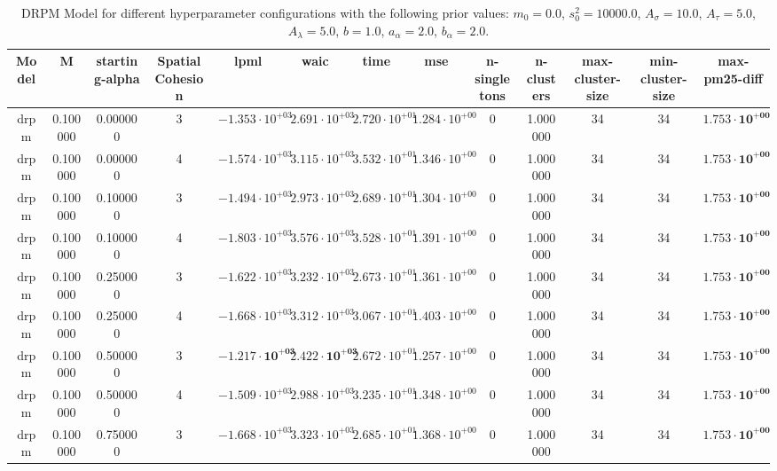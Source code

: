 \begin{table}
\caption{DRPM Model for different hyperparameter configurations with the following prior values:  $m_0 = 0.0$, $s_0^2 = 10000.0$, $A_\sigma = 10.0$, $A_\tau = 5.0$, $A_\lambda = 5.0$, $b = 1.0$, $a_\alpha = 2.0$, $b_\alpha = 2.0$.}
\centering
\begin{tabular}{ccccccccccccc}
\toprule
Model & M & starting-alpha & SpatialCohesion & lpml & waic & time & mse & n-singletons & n-clusters & max-cluster-size & min-cluster-size & max-pm25-diff \\
\midrule
drpm & 0.100000 & 0.000000 & 3 & $-1.353 \cdot 10^{+03}$ & $2.691 \cdot 10^{+03}$ & $2.720 \cdot 10^{+01}$ & $1.284 \cdot 10^{+00}$ & 0 & 1.000000 & 34 & 34 & $\mathbf{1.753 \cdot 10^{+00}}$ \\
drpm & 0.100000 & 0.000000 & 4 & $-1.574 \cdot 10^{+03}$ & $3.115 \cdot 10^{+03}$ & $3.532 \cdot 10^{+01}$ & $1.346 \cdot 10^{+00}$ & 0 & 1.000000 & 34 & 34 & $\mathbf{1.753 \cdot 10^{+00}}$ \\
drpm & 0.100000 & 0.100000 & 3 & $-1.494 \cdot 10^{+03}$ & $2.973 \cdot 10^{+03}$ & $2.689 \cdot 10^{+01}$ & $1.304 \cdot 10^{+00}$ & 0 & 1.000000 & 34 & 34 & $\mathbf{1.753 \cdot 10^{+00}}$ \\
drpm & 0.100000 & 0.100000 & 4 & $-1.803 \cdot 10^{+03}$ & $3.576 \cdot 10^{+03}$ & $3.528 \cdot 10^{+01}$ & $1.391 \cdot 10^{+00}$ & 0 & 1.000000 & 34 & 34 & $\mathbf{1.753 \cdot 10^{+00}}$ \\
drpm & 0.100000 & 0.250000 & 3 & $-1.622 \cdot 10^{+03}$ & $3.232 \cdot 10^{+03}$ & $2.673 \cdot 10^{+01}$ & $1.361 \cdot 10^{+00}$ & 0 & 1.000000 & 34 & 34 & $\mathbf{1.753 \cdot 10^{+00}}$ \\
drpm & 0.100000 & 0.250000 & 4 & $-1.668 \cdot 10^{+03}$ & $3.312 \cdot 10^{+03}$ & $3.067 \cdot 10^{+01}$ & $1.403 \cdot 10^{+00}$ & 0 & 1.000000 & 34 & 34 & $\mathbf{1.753 \cdot 10^{+00}}$ \\
drpm & 0.100000 & 0.500000 & 3 & $\mathbf{-1.217 \cdot 10^{+03}}$ & $\mathbf{2.422 \cdot 10^{+03}}$ & $2.672 \cdot 10^{+01}$ & $1.257 \cdot 10^{+00}$ & 0 & 1.000000 & 34 & 34 & $\mathbf{1.753 \cdot 10^{+00}}$ \\
drpm & 0.100000 & 0.500000 & 4 & $-1.509 \cdot 10^{+03}$ & $2.988 \cdot 10^{+03}$ & $3.235 \cdot 10^{+01}$ & $1.348 \cdot 10^{+00}$ & 0 & 1.000000 & 34 & 34 & $\mathbf{1.753 \cdot 10^{+00}}$ \\
drpm & 0.100000 & 0.750000 & 3 & $-1.668 \cdot 10^{+03}$ & $3.323 \cdot 10^{+03}$ & $2.685 \cdot 10^{+01}$ & $1.368 \cdot 10^{+00}$ & 0 & 1.000000 & 34 & 34 & $\mathbf{1.753 \cdot 10^{+00}}$ \\

\end{tabular}
\end{table}
